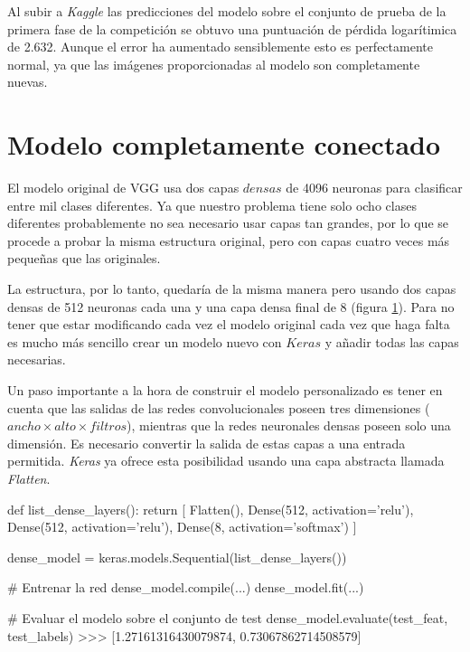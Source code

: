 Al subir a \textit{Kaggle} las predicciones del modelo sobre el conjunto de
prueba de la primera fase de la competición se obtuvo una puntuación de pérdida
logarítimica de 2.632. Aunque el error ha aumentado sensiblemente esto es
perfectamente normal, ya que las imágenes proporcionadas al modelo son
completamente nuevas.

\section{Modelo completamente conectado}
\label{sec:model_connected}

El modelo original de VGG usa dos capas $densas$ de 4096 neuronas para
clasificar entre mil clases diferentes. Ya que nuestro problema tiene solo ocho
clases diferentes probablemente no sea necesario usar capas tan grandes, por lo
que se procede a probar la misma estructura original, pero con capas cuatro
veces más pequeñas que las originales.

La estructura, por lo tanto, quedaría de la misma manera pero usando dos capas
densas de 512 neuronas cada una y una capa densa final de 8 (figura
\ref{standard_arch}). Para no tener que estar modificando cada vez el modelo
original cada vez que haga falta es mucho más sencillo crear un modelo nuevo
con $Keras$ y añadir todas las capas necesarias.

\begin{figure}
  \caption{}
\label{standard_arch}
\end{figure}

Un paso importante a la hora de construir el modelo personalizado es tener en cuenta que las salidas de las redes convolucionales poseen tres dimensiones ($ancho \times alto \times filtros$), mientras que la redes neuronales densas poseen solo una dimensión. Es necesario convertir la salida de estas capas a una entrada permitida. \textit{Keras} ya ofrece esta posibilidad usando una capa abstracta llamada \textit{Flatten}.

\begin{python}
def list_dense_layers():
    return [
        Flatten(),
        Dense(512, activation='relu'),
        Dense(512, activation='relu'),
        Dense(8, activation='softmax')
    ]

dense_model = keras.models.Sequential(list_dense_layers())

# Entrenar la red
dense_model.compile(...)
dense_model.fit(...)

# Evaluar el modelo sobre el conjunto de test
dense_model.evaluate(test_feat, test_labels)
>>> [1.27161316430079874, 0.73067862714508579]
\end{python}

